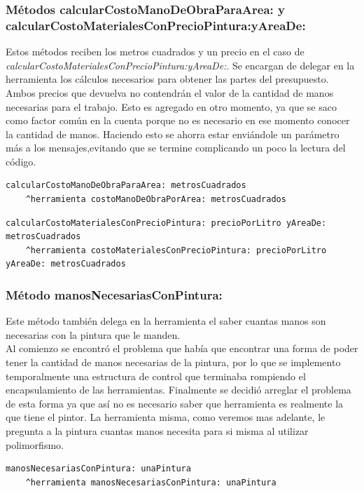 \documentclass[titlepage,a4paper]{article}
\begin{document}
\subsubsection*{Métodos calcularCostoManoDeObraParaArea: y calcularCostoMaterialesConPrecioPintura:yAreaDe:}
\indent Estos métodos reciben los metros cuadrados y un precio en el caso de \textit{calcularCostoMaterialesConPrecioPintura:yAreaDe:}. Se encargan de delegar en la herramienta los cálculos necesarios para obtener las partes del presupuesto. Ambos precios que devuelva no contendrán el valor de la cantidad de manos necesarias para el trabajo. Esto es agregado en otro momento, ya que se saco como factor común en la cuenta porque no es necesario en ese momento conocer la cantidad de manos. Haciendo esto se ahorra estar enviándole un parámetro más a los mensajes,evitando que se termine complicando un poco la lectura del código.\\

\begin{verbatim}
calcularCostoManoDeObraParaArea: metrosCuadrados	
    ^herramienta costoManoDeObraPorArea: metrosCuadrados 
\end{verbatim}

\begin{verbatim}
calcularCostoMaterialesConPrecioPintura: precioPorLitro yAreaDe: metrosCuadrados
    ^herramienta costoMaterialesConPrecioPintura: precioPorLitro  yAreaDe: metrosCuadrados    
\end{verbatim}
\medskip

\subsubsection*{Método manosNecesariasConPintura:}
\indent Este método también delega en la herramienta el saber cuantas manos son necesarias con la pintura que le manden. \\
\indent Al comienzo se encontró el problema que había que encontrar una forma de poder tener la cantidad de manos necesarias de la pintura, por lo que se implemento temporalmente una estructura de control que terminaba rompiendo el encapsulamiento de las herramientas. Finalmente se decidió arreglar el problema de esta forma ya que así no es necesario saber que herramienta es realmente la que tiene el pintor. La herramienta misma, como veremos mas adelante, le pregunta a la pintura cuantas manos necesita para si misma al utilizar polimorfismo.
\begin{verbatim}
manosNecesariasConPintura: unaPintura
    ^herramienta manosNecesariasConPintura: unaPintura
\end{verbatim}
\end{document}
